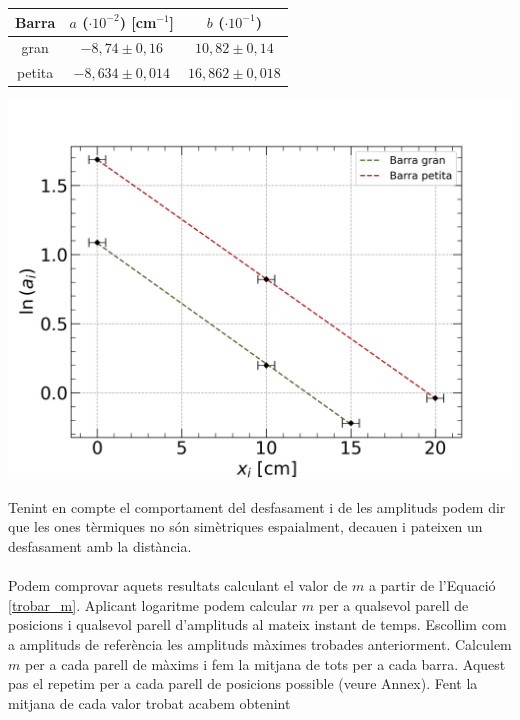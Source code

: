 \documentclass[12pt,twosides,onecolumn,openany]{article}
\newenvironment{Figura}
  {\par\medskip\noindent\minipage{\linewidth}}
  {\endminipage\par\medskip}
\begin{document}
\begin{multicols}{2}
\begin{Figura}
  \begin{tabular}{c|c|c}
    Barra & $a$ ($\cdot 10^{-2}$) [cm$^{-1}$] & $b$ ($\cdot10^{-1}$) \\ \hline\hline
    gran & $-8,74\pm0,16$ & $10,82\pm0,14$\\
    petita & $-8,634\pm0,014$ & $16,862\pm0,018$ 
  \end{tabular}
  \label{tau:pendent_amplituds}
\end{Figura} 
\begin{Figura}
  \centering
  \includegraphics[width=1\linewidth]{../../graphs/practica_Ia/plots/reg_ampli.png}
  \label{fig:reg_lin_amplituds}
\end{Figura}
Tenint en compte el comportament del desfasament i de les amplituds podem dir que les ones tèrmiques no són simètriques espaialment, decauen i pateixen un desfasament amb la distància.\\\\
Podem comprovar aquets resultats calculant el valor de $m$ a partir de l'Equació \ref{trobar_m}. Aplicant logaritme podem calcular $m$ per a qualsevol parell de posicions i qualsevol parell d'amplituds al mateix instant de temps. Escollim com a amplituds de referència les amplituds màximes trobades anteriorment. Calculem $m$ per a cada parell de màxims i fem la mitjana de tots per a cada barra. Aquest pas el repetim per a cada parell de posicions possible (veure Annex). Fent la mitjana de cada valor trobat acabem obtenint

\end{multicols}
\end{document}

